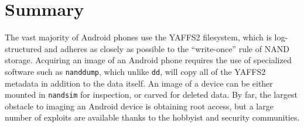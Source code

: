 \section{Summary}

The vast majority of Android phones use the YAFFS2 filesystem, which is log-structured and adheres as closely as possible to the
``write-once'' rule of NAND storage. Acquiring an image of an Android phone requires the use of specialized software such as
\texttt{nanddump}, which unlike \texttt{dd}, will copy all of the YAFFS2 metadata in addition to the data itself. An image of a
device can be either mounted in \texttt{nandsim} for inspection, or carved for deleted data. By far, the largest obstacle to imaging
an Android device is obtaining root access, but a large number of exploits are available thanks to the hobbyist and security
communities.
